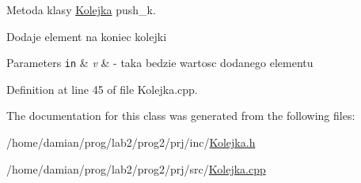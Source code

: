 Metoda klasy \hyperlink{class_kolejka}{Kolejka} push\-\_\-k. 

Dodaje element na koniec kolejki


\begin{DoxyParams}[1]{Parameters}
\mbox{\tt in}  & {\em v} & -\/ taka bedzie wartosc dodanego elementu \\
\hline
\end{DoxyParams}


Definition at line 45 of file Kolejka.\-cpp.



The documentation for this class was generated from the following files\-:\begin{DoxyCompactItemize}
\item 
/home/damian/prog/lab2/prog2/prj/inc/\hyperlink{_kolejka_8h}{Kolejka.\-h}\item 
/home/damian/prog/lab2/prog2/prj/src/\hyperlink{_kolejka_8cpp}{Kolejka.\-cpp}\end{DoxyCompactItemize}
